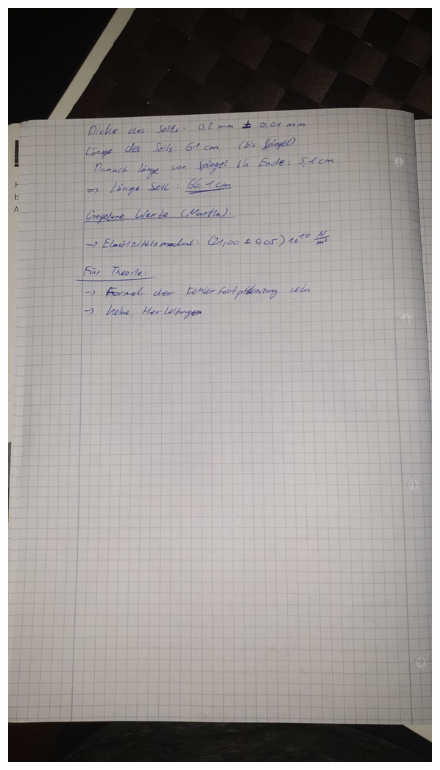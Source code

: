 \begin{figure}
    \centering
    \includegraphics[scale=0.38]{content/Bilder/Daten4.jpg}
\end{figure}